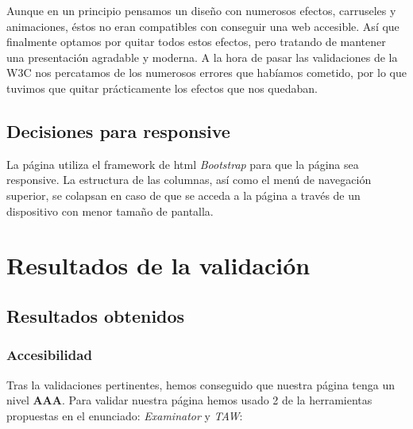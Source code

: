 Aunque en un principio pensamos un diseño con numerosos efectos, carruseles y animaciones, éstos no eran compatibles con conseguir una web accesible. Así que finalmente optamos por quitar todos estos efectos, pero tratando de mantener una presentación agradable y moderna.
A la hora de pasar las validaciones de la W3C nos percatamos de los numerosos errores que habíamos cometido, por lo que tuvimos que quitar prácticamente los efectos que nos quedaban.
\clearpage

\subsection{Decisiones para responsive}
La página utiliza el framework de html \textit{Bootstrap} para que la página sea responsive. La estructura de las columnas, así como el menú de navegación superior, se colapsan en caso de que se acceda a la página a través de un dispositivo con menor tamaño de pantalla.
\section{Resultados de la validación}
\subsection{Resultados obtenidos}

\subsubsection{Accesibilidad}
Tras la validaciones pertinentes, hemos conseguido que nuestra página tenga un nivel \textbf{AAA}. Para validar nuestra página hemos usado 2 de la herramientas propuestas en el enunciado: \textit{Examinator} y \textit{TAW}:

